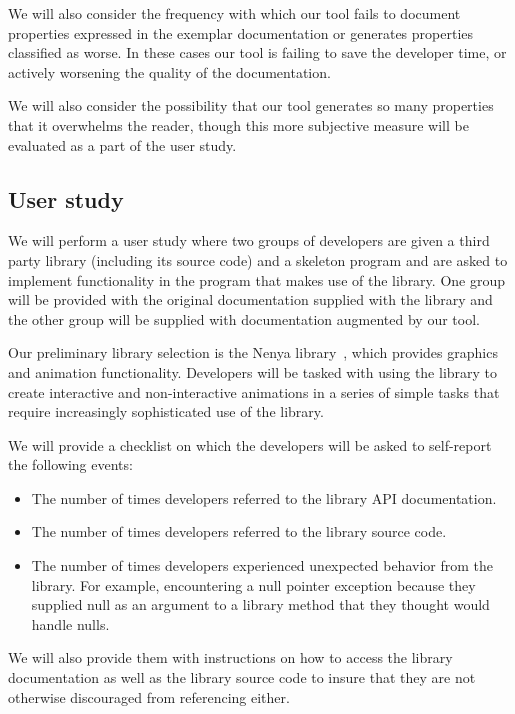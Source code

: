 We will also consider the frequency with which our tool fails to document
properties expressed in the exemplar documentation or generates properties
classified as worse. In these cases our tool is failing to save the developer
time, or actively worsening the quality of the documentation.

We will also consider the possibility that our tool generates so many
properties that it overwhelms the reader, though this more subjective measure
will be evaluated as a part of the user study.

\subsection{User study}

We will perform a user study where two groups of developers are given a third
party library (including its source code) and a skeleton program and are asked
to implement functionality in the program that makes use of the library. One
group will be provided with the original documentation supplied with the
library and the other group will be supplied with documentation augmented by
our tool.

Our preliminary library selection is the Nenya library~\cite{nenya}, which
provides graphics and animation functionality. Developers will be tasked with
using the library to create interactive and non-interactive animations in a
series of simple tasks that require increasingly sophisticated use of the
library.

We will provide a checklist on which the developers will be asked to
self-report the following events:

\begin{itemize}
\item The number of times developers referred to the library API documentation.
\item The number of times developers referred to the library source code.
\item The number of times developers experienced unexpected behavior from the
  library. For example, encountering a null pointer exception because they
  supplied null as an argument to a library method that they thought would
  handle nulls.
\end{itemize}

We will also provide them with instructions on how to access the library
documentation as well as the library source code to insure that they are not
otherwise discouraged from referencing either.

